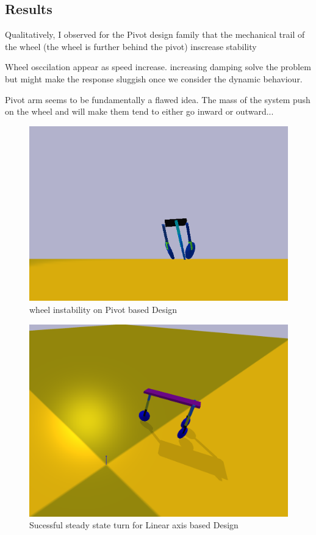 \subsection{Results}


Qualitatively, I observed for the Pivot design family that the mechanical trail of the wheel (the wheel is further behind the pivot) inscrease stability

Wheel osccilation appear as speed increase. increasing damping solve the problem but might make the response sluggish once we consider the dynamic behaviour.

Pivot arm seems to be fundamentally a flawed idea. The mass of the system push on the wheel and will make them tend to either go inward or outward...

\begin{figure}[h!]
    \centering
    \includegraphics[width=0.5\linewidth]{Figures/ch7_inwardWheel.png}
    \caption{wheel instability on Pivot based Design}
    \label{fig:wheel_instability}
\end{figure}

\begin{figure}
    \centering
    \includegraphics[width=0.5\linewidth]{Figures/ch8_ThreeWheelLinearTurning.png}
    \caption{Sucessful steady state turn for Linear axis based Design}
    \label{fig:linear_success_turn}
\end{figure}